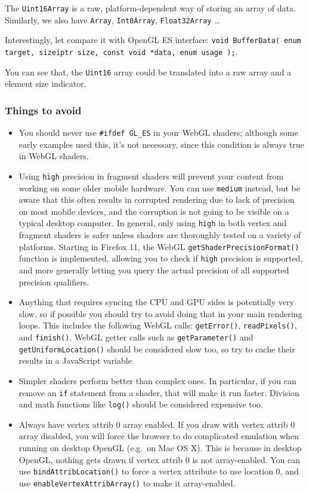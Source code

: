 \documentclass[]{article}
\begin{document}
The \texttt{Uint16Array} is a raw, platform-dependent way of storing an
array of data. Similarly, we also have \texttt{Array},
\texttt{Int8Array}, \texttt{Float32Array} \ldots{}

Interestingly, let compare it with OpenGL ES interface:
\texttt{void BufferData( enum target, sizeiptr size, const void *data, enum usage );}.

You can see that, the \texttt{Uint16} array could be translated into a
raw array and a element size indicator.

\subsubsection{Things to avoid}\label{things-to-avoid}

\begin{itemize}
\itemsep1pt\parskip0pt
\item
  You should never use \texttt{\#ifdef GL\_ES} in your WebGL shaders;
  although some early examples used this, it's not necessary, since this
  condition is always true in WebGL shaders.
\item
  Using \texttt{high} precision in fragment shaders will prevent your
  content from working on some older mobile hardware. You can use
  \texttt{medium} instead, but be aware that this often results in
  corrupted rendering due to lack of precision on most mobile devices,
  and the corruption is not going to be visible on a typical desktop
  computer. In general, only using \texttt{high} in both vertex and
  fragment shaders is safer unless shaders are thoroughly tested on a
  variety of platforms. Starting in Firefox 11, the WebGL
  \texttt{getShaderPrecisionFormat()} function is implemented, allowing
  you to check if \texttt{high} precision is supported, and more
  generally letting you query the actual precision of all supported
  precision qualifiers.
\item
  Anything that requires syncing the CPU and GPU sides is potentially
  very slow, so if possible you should try to avoid doing that in your
  main rendering loops. This includes the following WebGL calls:
  \texttt{getError()}, \texttt{readPixels()}, and \texttt{finish()}.
  WebGL getter calls such as \texttt{getParameter()} and
  \texttt{getUniformLocation()} should be considered slow too, so try to
  cache their results in a JavaScript variable.
\item
  Simpler shaders perform better than complex ones. In particular, if
  you can remove an \texttt{if} statement from a shader, that will make
  it run faster. Division and math functions like \texttt{log()} should
  be considered expensive too.
\item
  Always have vertex attrib 0 array enabled. If you draw with vertex
  attrib 0 array disabled, you will force the browser to do complicated
  emulation when running on desktop OpenGL (e.g.~on Mac OS X). This is
  because in desktop OpenGL, nothing gets drawn if vertex attrib 0 is
  not array-enabled. You can use \texttt{bindAttribLocation()} to force
  a vertex attribute to use location 0, and use
  \texttt{enableVertexAttribArray()} to make it array-enabled.
\end{itemize}
\end{document}
